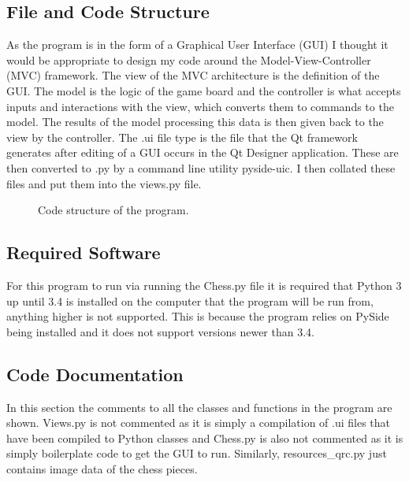 \subsection{File and Code Structure}
As the program is in the form of a Graphical User Interface (GUI) I thought it would be appropriate to design my code around the Model-View-Controller (MVC) framework. The view of the MVC architecture is the definition of the GUI. The model is the logic of the game board and the controller is what accepts inputs and interactions with the view, which converts them to commands to the model. The results of the model processing this data is then given back to the view by the controller. The .ui file type is the file that the Qt framework generates after editing of a GUI occurs in the Qt Designer application. These are then converted to .py by a command line utility pyside-uic. I then collated these files and put them into the views.py file.
\begin{figure}[H]
	\caption{Code structure of the program.}
\end{figure}
\subsection{Required Software}
For this program to run via running the Chess.py file it is required that Python 3 up until 3.4 is installed on the computer that the program will be run from, anything higher is not supported. This is because the program relies on PySide being installed and it does not support versions newer than 3.4. 
\subsection{Code Documentation}
In this section the comments to all the classes and functions in the program are shown. Views.py is not commented as it is simply a compilation of .ui files that have been compiled to Python classes and Chess.py is also not commented as it is simply boilerplate code to get the GUI to run. Similarly, resources{\_}qrc.py just contains image data of the chess pieces.

